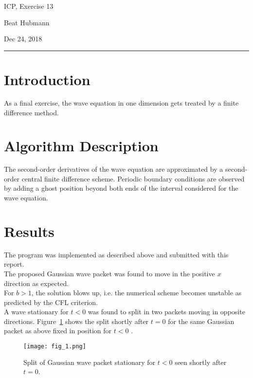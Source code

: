 \documentclass[11pt,a4paper]{article}
\begin{document}
\noindent\parbox{\linewidth}{
 \parbox{.25\linewidth}{ \large ICP, Exercise 13 }\hfill
 \parbox{.5\linewidth}{\begin{center} \large Beat Hubmann \end{center}}\hfill
 \parbox{.2\linewidth}{\begin{flushright} \large Dec 24, 2018 \end{flushright}}
}
\noindent\rule{\linewidth}{2pt}


\section{Introduction}

As a final exercise, the wave equation in one dimension gets treated by a finite difference method.

\section{Algorithm Description}
The second-order derivatives of the wave equation are approximated by a second-order central finite difference scheme.
Periodic boundary conditions are observed by adding a ghost position beyond both ends of the interval considered for the wave equation.


\section{Results}

The program was implemented as described above and submitted with this report. \\
The proposed Gaussian wave packet was found to move in the positive $x$ direction as expected.\\
For $b > 1$, the solution blows up, i.e. the numerical scheme becomes unstable as predicted by the CFL criterion.\\
A wave stationary for $t < 0$ was found to split in two packets moving in opposite directions. Figure~\ref{fig:1} shows the split shortly after $t=0$ for the same
Gaussian packet as above fixed in position for $t < 0$ .


\begin{figure}[ht]
\begin{center}
\texttt{[image: fig\_1.png]} 
\end{center}
\caption{Split of Gaussian wave packet stationary for $t<0$ seen shortly after $t=0$.}
\label{fig:1}
\end{figure}
\end{document}
